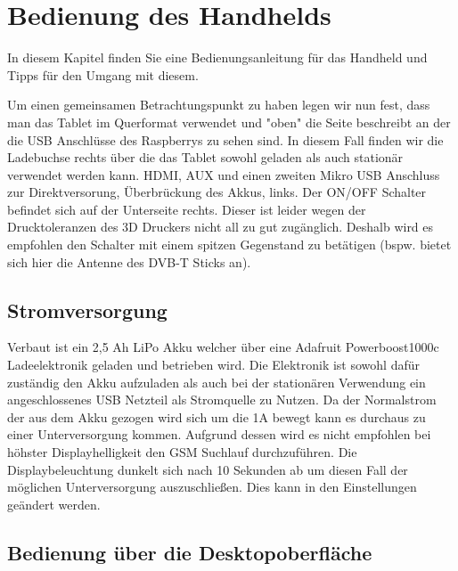 %
%

\chapter{Bedienung des Handhelds}
In diesem Kapitel finden Sie eine Bedienungsanleitung für das Handheld und Tipps für den Umgang mit diesem.

Um einen gemeinsamen Betrachtungspunkt zu haben legen wir nun fest, dass man das Tablet im Querformat verwendet und "oben" die Seite beschreibt an der die USB Anschlüsse des Raspberrys zu sehen sind. In diesem Fall finden wir die Ladebuchse rechts über die das Tablet sowohl geladen als auch stationär verwendet werden kann. HDMI, AUX und einen zweiten Mikro USB Anschluss zur Direktversorung, Überbrückung des Akkus, links. Der ON/OFF Schalter befindet sich auf der Unterseite rechts. Dieser ist leider wegen der Drucktoleranzen des 3D Druckers nicht all zu gut zugänglich. Deshalb wird es empfohlen den Schalter mit einem spitzen Gegenstand zu betätigen (bspw. bietet sich hier die Antenne des DVB-T Sticks an).


\section{Stromversorgung}

Verbaut ist ein 2,5 Ah LiPo Akku welcher über eine Adafruit Powerboost1000c Ladeelektronik geladen und betrieben wird. Die Elektronik ist sowohl dafür zuständig den Akku aufzuladen als auch bei der stationären Verwendung ein angeschlossenes USB Netzteil als Stromquelle zu Nutzen. Da der Normalstrom der aus dem Akku gezogen wird sich um die 1A bewegt kann es durchaus zu einer Unterversorgung kommen. Aufgrund dessen wird es nicht empfohlen bei höhster Displayhelligkeit den \ac{GSM} Suchlauf durchzuführen. Die Displaybeleuchtung dunkelt sich nach 10 Sekunden ab um diesen Fall der möglichen Unterversorgung auszuschließen. Dies kann in den Einstellungen geändert werden. 


\section{Bedienung über die Desktopoberfläche}


